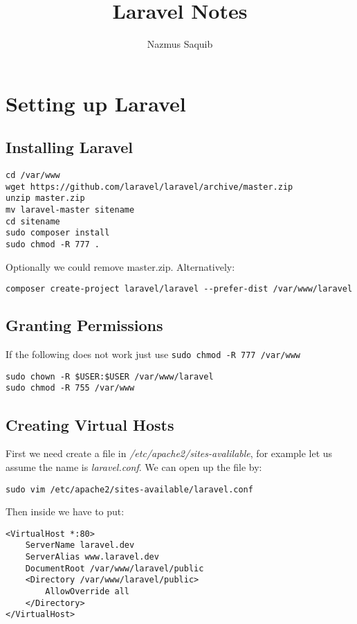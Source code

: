 \documentclass[a4paper, 12pt]{article}
\begin{document}
\title{Laravel Notes}
\author{Nazmus Saquib}

\maketitle
\tableofcontents

\section{Setting up Laravel}
\subsection{Installing Laravel}
\begin{verbatim}
cd /var/www
wget https://github.com/laravel/laravel/archive/master.zip
unzip master.zip
mv laravel-master sitename
cd sitename
sudo composer install
sudo chmod -R 777 .
\end{verbatim}
Optionally we could remove master.zip.
Alternatively:
\begin{verbatim}
composer create-project laravel/laravel --prefer-dist /var/www/laravel
\end{verbatim}
\subsection{Granting Permissions}
If the following does not work just use \verb|sudo chmod -R 777 /var/www|
\begin{verbatim}
sudo chown -R $USER:$USER /var/www/laravel
sudo chmod -R 755 /var/www
\end{verbatim}
\subsection{Creating Virtual Hosts}
First we need create a file in \emph{/etc/apache2/sites-avalilable}, for example let us assume the name is \emph{laravel.conf}.
We can open up the file by:
\begin{verbatim}
sudo vim /etc/apache2/sites-available/laravel.conf
\end{verbatim}

Then inside we have to put:
\begin{verbatim}
<VirtualHost *:80>
	ServerName laravel.dev
	ServerAlias www.laravel.dev
	DocumentRoot /var/www/laravel/public
	<Directory /var/www/laravel/public>
		AllowOverride all
	</Directory>
</VirtualHost>
\end{verbatim}
\end{document}
